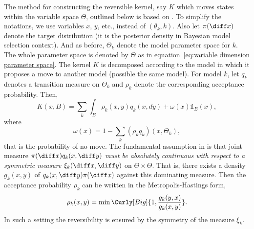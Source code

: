 The method for constructing the reversible kernel, say $K$ which moves states
within the variable space $\Theta$, outlined below is based on
\textcite[][chap.~11]{Robert:2004tn}. To simplify the notations, we use
variables $x$, $y$, etc., instead of $(\theta_k, k)$. Also let $\pi(\diff x)$
denote the target distribution (it is the posterior density in Bayesian model
selection context). And as before, $\Theta_k$ denote the model parameter space
for $k$. The whole parameter space is denoted by $\Theta$ as in
equation~\eqref{eq:variable dimension parameter space}. The kernel $K$ is
decomposed according to the model in which it proposes a move to another model
(possible the same model). For model $k$, let $q_k$ denotes a transition
measure on $\Theta_k$ and $\rho_k$ denote the corresponding acceptance
probability. Then,
\begin{equation}
  K(x,B) = \sum_k\int_B\rho_k(x,y)q_k(x,dy)+\omega(x)\mathbb{1}_B(x),
\end{equation}
where
\begin{equation}
  \omega(x) = 1 - \sum_k(\rho_k q_k)(x,\Theta_k),
\end{equation}
that is the probability of no move. The fundamental assumption in
\textcite{Green:1995dg} is that joint measure $\pi(\diff x)q_k(x,\diff y)$
\emph{must be absolutely continuous with respect to a symmetric measure}
$\xi_k(\diff x, \diff y)$ on $\Theta\times\Theta$. That is, there exists a density
$g_k(x,y)$ of $q_k(x,\diff y)\pi(\diff x)$ against this dominating measure.
Then the acceptance probability $\rho_k$ can be written in the
Metropolis-Hastings form,
\begin{equation}
  \rho_k(x,y) = \min\Curly[Big]{1,\frac{g_k(y,x)}{g_k(x,y)}}.
\end{equation}
In such a setting the reversibility is ensured by the symmetry of the measure
$\xi_k$.

